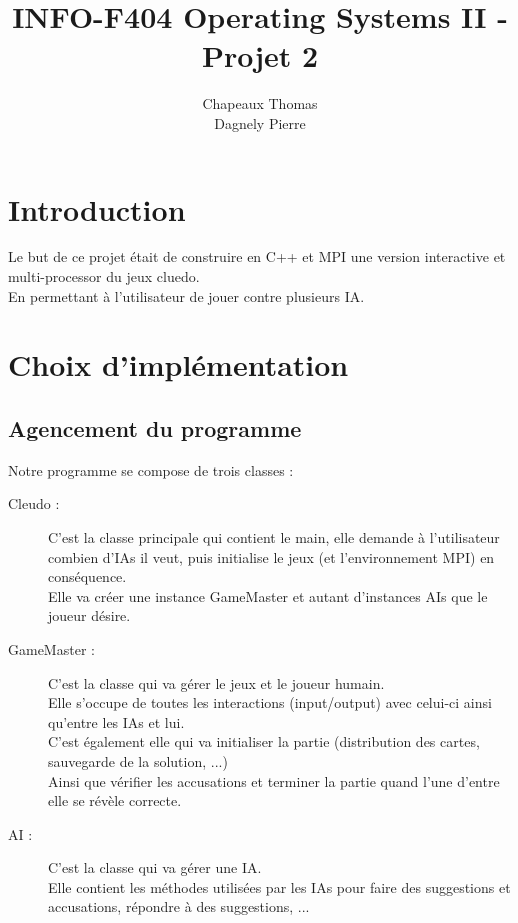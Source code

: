 \documentclass[a4paper,10pt]{article}
\title{INFO-F404 Operating Systems II - Projet 2}
\author{Chapeaux Thomas\\Dagnely Pierre}
\begin{document}
\maketitle

\section{Introduction}

	Le but de ce projet était de construire en C++ et MPI une version interactive et multi-processor du jeux cluedo.\\
	En permettant à l'utilisateur de jouer contre plusieurs IA.

\section{Choix d'implémentation}

	\subsection{Agencement du programme}
		Notre programme se compose de trois classes :
		\begin{description}
			\item[Cleudo :] C'est la classe principale qui contient le main, elle demande à l'utilisateur combien d'IAs il veut, puis initialise le jeux (et l’environnement MPI) en conséquence.\\
							Elle va créer une instance GameMaster et autant d'instances AIs que le joueur désire.
			\item[GameMaster :] C'est la classe qui va gérer le jeux et le joueur humain.\\
							Elle s'occupe de toutes les interactions (input/output) avec celui-ci ainsi qu'entre les IAs et lui.\\
							C'est également elle qui va initialiser la partie (distribution des cartes, sauvegarde de la solution, ...)\\
							Ainsi que vérifier les accusations et terminer la partie quand l'une d'entre elle se révèle correcte.
			\item[AI :]	C'est la classe qui va gérer une IA.\\
							Elle contient les méthodes utilisées par les IAs pour faire des suggestions et accusations, répondre à des suggestions, ...
		\end{description}
		
\end{document}
